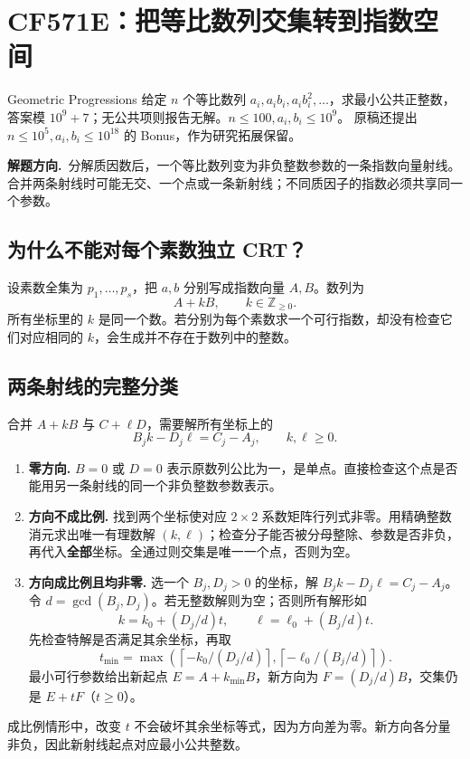 \documentclass[UTF8,a4paper,11pt,twoside,openright,fontset=fandol]{ctexbook}
\theoremstyle{definition}
\newcommand{\Z}{\mathbb Z}
\newcommand{\ceil}[1]{\left\lceil #1\right\rceil}
\newcommand{\hint}{\par\noindent\textbf{解题方向.}\ }
\begin{document}
\section{CF571E：把等比数列交集转到指数空间}
\begin{problem}{Geometric Progressions}
给定 $n$ 个等比数列 $a_i,a_ib_i,a_ib_i^2,\ldots$，求最小公共正整数，答案模 $10^9+7$；无公共项则报告无解。$n\le100,a_i,b_i\le10^9$。
原稿还提出 $n\le10^5,a_i,b_i\le10^{18}$ 的 Bonus，作为研究拓展保留。
\end{problem}
\hint 分解质因数后，一个等比数列变为非负整数参数的一条指数向量射线。合并两条射线时可能无交、一个点或一条新射线；不同质因子的指数必须共享同一个参数。

\subsection{为什么不能对每个素数独立 CRT？}
设素数全集为 $p_1,\ldots,p_s$，把 $a,b$ 分别写成指数向量 $A,B$。数列为
\[
 A+kB,\qquad k\in\Z_{\ge0}.
\]
所有坐标里的 $k$ 是同一个数。若分别为每个素数求一个可行指数，却没有检查它们对应相同的 $k$，会生成并不存在于数列中的整数。

\subsection{两条射线的完整分类}
合并 $A+kB$ 与 $C+\ell D$，需要解所有坐标上的
\[
 B_jk-D_j\ell=C_j-A_j,\qquad k,\ell\ge0.
\]
\begin{enumerate}
\item \textbf{零方向.} $B=0$ 或 $D=0$ 表示原数列公比为一，是单点。直接检查这个点是否能用另一条射线的同一个非负整数参数表示。
\item \textbf{方向不成比例.} 找到两个坐标使对应 $2\times2$ 系数矩阵行列式非零。用精确整数消元求出唯一有理数解 $(k,\ell)$；检查分子能否被分母整除、参数是否非负，再代入\textbf{全部}坐标。全通过则交集是唯一一个点，否则为空。
\item \textbf{方向成比例且均非零.} 选一个 $B_j,D_j>0$ 的坐标，解
$B_jk-D_j\ell=C_j-A_j$。令 $d=\gcd(B_j,D_j)$。若无整数解则为空；否则所有解形如
\[
 k=k_0+(D_j/d)t,\qquad\ell=\ell_0+(B_j/d)t.
\]
先检查特解是否满足其余坐标，再取
\[
 t_{\min}=\max\left(\ceil{-k_0/(D_j/d)},\ceil{-\ell_0/(B_j/d)}\right).
\]
最小可行参数给出新起点 $E=A+k_{\min}B$，新方向为 $F=(D_j/d)B$，交集仍是 $E+tF$（$t\ge0$）。
\end{enumerate}
成比例情形中，改变 $t$ 不会破坏其余坐标等式，因为方向差为零。新方向各分量非负，因此新射线起点对应最小公共整数。
\end{document}
